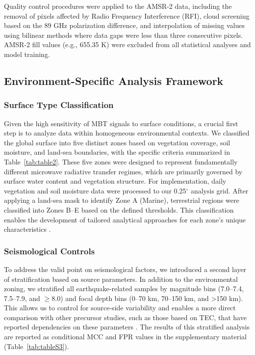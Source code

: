 \documentclass[preprint,review,12pt,authoryear]{elsarticle}
\begin{document}
Quality control procedures were applied to the AMSR-2 data, including the removal of pixels affected by Radio Frequency Interference (RFI), cloud screening based on the 89 GHz polarization difference, and interpolation of missing values using bilinear methods where data gaps were less than three consecutive pixels. AMSR-2 fill values (e.g., 655.35 K) were excluded from all statistical analyses and model training.

\subsection{Environment-Specific Analysis Framework}\label{sec:env_framework}

\subsubsection{Surface Type Classification}\label{sec:surface_classification}
Given the high sensitivity of MBT signals to surface conditions, a crucial first step is to analyze data within homogeneous environmental contexts. We classified the global surface into five distinct zones based on vegetation coverage, soil moisture, and land-sea boundaries, with the specific criteria summarized in Table~\ref{tab:table2}. These five zones were designed to represent fundamentally different microwave radiative transfer regimes, which are primarily governed by surface water content and vegetation structure. For implementation, daily vegetation and soil moisture data were processed to our 0.25$^{\circ}$ analysis grid. After applying a land-sea mask to identify Zone A (Marine), terrestrial regions were classified into Zones B--E based on the defined thresholds. This classification enables the development of tailored analytical approaches for each zone's unique characteristics \citep{oweMethodologySurfaceSoil2001}.

\subsubsection{Seismological Controls}\label{sec:seismo_controls}
To address the valid point on seismological factors, we introduced a second layer of stratification based on source parameters. In addition to the environmental zoning, we stratified all earthquake-related samples by magnitude bins (7.0--7.4, 7.5--7.9, and $\ge$8.0) and focal depth bins (0--70 km, 70--150 km, and >150 km). This allows us to control for source-side variability and enables a more direct comparison with other precursor studies, such as those based on TEC, that have reported dependencies on these parameters \citep{Shah2020TotalEC}. The results of this stratified analysis are reported as conditional MCC and FPR values in the supplementary material (Table~\ref{tab:tableS3}).
\end{document}
